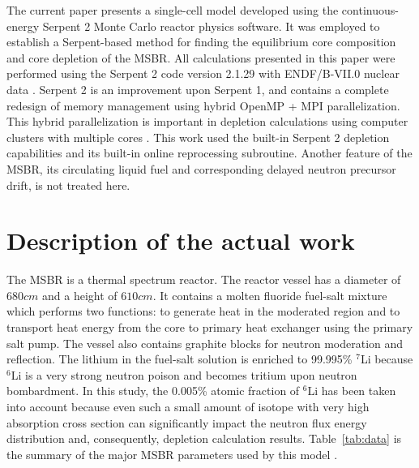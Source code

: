 \documentclass{anstrans}
\begin{document}
The current paper presents a single-cell model developed using the
continuous-energy Serpent 2 Monte Carlo reactor physics software. It was 
employed to establish a Serpent-based method for finding the equilibrium core composition and 
core depletion of the \gls{MSBR}.
All calculations presented in this paper were performed using the Serpent 2 
code version 2.1.29 with ENDF/B-VII.0
nuclear data \cite{leppanen_serpent_2012,chadwick_endf/b-vii.0:_2006}. Serpent 
2 is an improvement upon Serpent 1, and contains a complete 
redesign of memory management using hybrid OpenMP + MPI parallelization.  This 
hybrid parallelization is important in depletion calculations using computer 
clusters with multiple cores \cite{leppanen_serpent_2015}. This work used the 
built-in Serpent 2 depletion capabilities and its built-in online reprocessing 
subroutine. Another feature of the \gls{MSBR}, its circulating liquid fuel and 
corresponding delayed neutron precursor drift, is not treated here.

\section{Description of the actual work}
The \gls{MSBR} is a thermal spectrum reactor. The reactor vessel has a diameter of 
$680 cm$ and a height of $610 cm$. It contains a molten fluoride fuel-salt mixture 
which performs two functions: to generate heat in the moderated region and to 
transport heat energy from the core to primary heat exchanger using the primary 
salt pump. The vessel also contains graphite blocks for neutron moderation and 
reflection. The lithium in the fuel-salt solution is enriched to 99.995\% 
$^7$Li because $^6$Li is a very strong neutron poison and becomes tritium upon 
neutron bombardment. In this study, the 0.005\% atomic fraction of $^6$Li has 
been taken into account because even such a small amount of isotope with very 
high absorption cross section can significantly impact the neutron flux energy 
distribution and, consequently, depletion calculation results. 
Table~\ref{tab:data} is the summary of the major \gls{MSBR} parameters used by 
this model \cite{robertson_conceptual_1971}. 
\end{document}
